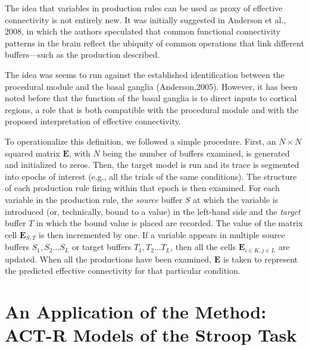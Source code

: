 \documentclass[10pt,letterpaper]{article}
\newcommand{\mat}[1]{\boldsymbol{#1}} %
\begin{document}
The idea that variables in production rules can be used as proxy of effective connectivity is not entirely new. It was initially suggested in Anderson et al., 2008, in which the authors speculated that common functional connectivity patterns in the brain reflect the ubiquity of common operations that link different buffers---such as the production described.

The idea was seems to run against the established identification between the procedural module and the basal ganglia (Anderson,2005). However, it has been noted before that the function of the basal ganglia is to direct inputs to cortical regions, a role that is both compatible with the procedural module and with the proposed interpretation of effective connectivity.

To operationalize this definition, we followed a simple procedure. First, an $N \times N$ squared matrix ${\mat{E}}$, with $N$ being the number of buffers examined, is generated and initialized to zeros. Then, the target model is run and its trace is segmented into epochs of interest  (e.g., all the trials of the same conditions). The structure of each production rule firing within that epoch is then examined. For each variable in the production rule, the {\it source} buffer $S$ at which the variable is introduced (or, technically, bound to a value) in the left-hand side and the {\it target} buffer $T$ in which the bound value is placed are recorded. The value of the matrix cell $\mat{E}_{S,T}$ is then incremented by one. If a variable appears in multiple source buffers $S_1, S_2 \dots S_L$ or target buffers $T_1, T_2 \dots T_L$, then all the cells $\mat{E}_{i \in K, j \in  L}$ are updated. When all the productions have been examined, $\mat{E}$ is taken to represent the predicted effective connectivity for that particular condition. 


\section{An Application of the Method: ACT-R Models of the Stroop Task}
\end{document}
